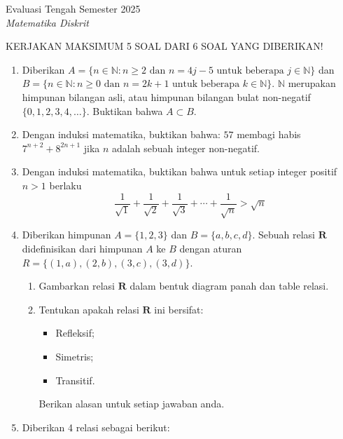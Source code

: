 \documentclass[12pt]{article}
\begin{document}
\begin{center}
    {Evaluasi Tengah Semester 2025} \\
    \textit{Matematika Diskrit} \\
\end{center}

\vspace{0.5cm}

\begin{center}
    {KERJAKAN MAKSIMUM 5 SOAL DARI 6 SOAL YANG DIBERIKAN!}
\end{center}

\begin{enumerate}
\item Diberikan $A = \{n \in \mathbb{N} : n \geq 2 \text{ dan } n = 4j - 5 \text{ untuk beberapa } j \in \mathbb{N}\}$ dan $B = \{n \in \mathbb{N} : n \geq 0 \text{ dan } n = 2k + 1 \text{ untuk beberapa } k \in \mathbb{N}\}$. $\mathbb{N}$ merupakan himpunan bilangan asli, atau himpunan bilangan bulat non-negatif $\{0, 1, 2, 3, 4, \ldots\}$. Buktikan bahwa $A \subset B$.

\item Dengan induksi matematika, buktikan bahwa: $57$ membagi habis $7^{n+2} + 8^{2n+1}$ jika $n$ adalah sebuah integer non-negatif.

\item Dengan induksi matematika, buktikan bahwa untuk setiap integer positif $n > 1$ berlaku
$$\frac{1}{\sqrt{1}} + \frac{1}{\sqrt{2}} + \frac{1}{\sqrt{3}} + \cdots + \frac{1}{\sqrt{n}} > \sqrt{n}$$

\item Diberikan himpunan $A = \{1, 2, 3\}$ dan $B = \{a, b, c, d\}$. Sebuah relasi $\mathbf{R}$ didefinisikan dari himpunan $A$ ke $B$ dengan aturan $R = \{(1, a), (2, b), (3, c), (3, d)\}$.
\begin{enumerate}
\item Gambarkan relasi $\mathbf{R}$ dalam bentuk diagram panah dan table relasi.
\item Tentukan apakah relasi $\mathbf{R}$ ini bersifat:
\begin{itemize}
\item Refleksif;
\item Simetris;
\item Transitif.
\end{itemize}
Berikan alasan untuk setiap jawaban anda.
\end{enumerate}

\item Diberikan 4 relasi sebagai berikut:


\end{enumerate}
\end{document}
